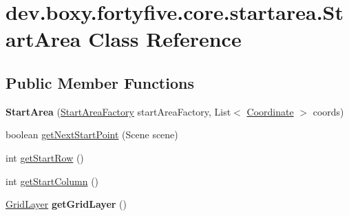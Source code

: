 \hypertarget{classdev_1_1boxy_1_1fortyfive_1_1core_1_1startarea_1_1_start_area}{
\section{dev.boxy.fortyfive.core.startarea.StartArea Class Reference}
\label{d0/daf/classdev_1_1boxy_1_1fortyfive_1_1core_1_1startarea_1_1_start_area}
}
\subsection*{Public Member Functions}
\begin{DoxyCompactItemize}
\item 
\hypertarget{classdev_1_1boxy_1_1fortyfive_1_1core_1_1startarea_1_1_start_area_a08ade9d3592ba2fcc13a940cb7d500f3}{
{\bfseries StartArea} (\hyperlink{classdev_1_1boxy_1_1fortyfive_1_1core_1_1startarea_1_1_start_area_factory}{StartAreaFactory} startAreaFactory, List$<$ \hyperlink{classdev_1_1boxy_1_1fortyfive_1_1core_1_1startarea_1_1_coordinate}{Coordinate} $>$ coords)}
\label{d0/daf/classdev_1_1boxy_1_1fortyfive_1_1core_1_1startarea_1_1_start_area_a08ade9d3592ba2fcc13a940cb7d500f3}

\item 
boolean \hyperlink{classdev_1_1boxy_1_1fortyfive_1_1core_1_1startarea_1_1_start_area_a7a931b727d8a10c4b0ccc675506a74e3}{getNextStartPoint} (Scene scene)
\item 
int \hyperlink{classdev_1_1boxy_1_1fortyfive_1_1core_1_1startarea_1_1_start_area_a24c05993ff1fe53a2f8fe4cedfe3e333}{getStartRow} ()
\item 
int \hyperlink{classdev_1_1boxy_1_1fortyfive_1_1core_1_1startarea_1_1_start_area_ab8f0bb13fce39601e819f6af76749e42}{getStartColumn} ()
\item 
\hypertarget{classdev_1_1boxy_1_1fortyfive_1_1core_1_1startarea_1_1_start_area_a486af77470f3d056037deade567ec5a3}{
\hyperlink{classdev_1_1boxy_1_1fortyfive_1_1_grid_layer}{GridLayer} {\bfseries getGridLayer} ()}
\label{d0/daf/classdev_1_1boxy_1_1fortyfive_1_1core_1_1startarea_1_1_start_area_a486af77470f3d056037deade567ec5a3}

\end{DoxyCompactItemize}
